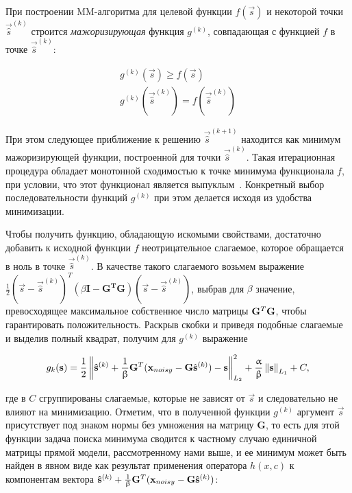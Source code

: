 При построении MM-алгоритма для целевой функции $f(\vec{s})$ и некоторой
точки $\vec{\hat{s}}^{(k)}$ строится \emph{мажоризирующая} функция $g^{(k)}$, совпадающая
с функцией $f$ в точке $\vec{\hat{s}}^{(k)}$:

\begin{gather*}
    g^{(k)}(\vec{s}) \geq f(\vec{s})\\
    g^{(k)}(\vec{\hat{s}}^{(k)}) = f(\vec{\hat{s}}^{(k)})
\end{gather*}

При этом следующее приближение к решению $\vec{\hat{s}}^{(k+1)}$ находится как
минимум мажоризирующей функции, построенной для точки $\vec{\hat{s}}^{(k)}$. Такая
итерационная процедура обладает монотонной сходимостью к точке минимума
функционала $f$, при условии, что этот функционал является выпуклым~\cite{Combettes2005}.
Конкретный выбор последовательности функций $g^{(k)}$ при этом
делается исходя из удобства минимизации.

Чтобы получить функцию, обладающую искомыми свойствами, достаточно добавить к
исходной функции $f$ неотрицательное слагаемое, которое обращается в ноль в
точке $\vec{\hat{s}}^{(k)}$.  В качестве такого слагаемого возьмем выражение
$\frac{1}{2}{(\vec{s} - \vec{\hat{s}}^{(k)})}^T {(\beta\mathbf{I - G^TG})}{(\vec{s} - \vec{\hat{s}}^{(k)})}$,
выбрав для $\beta$ значение, превосходящее максимальное собственное число матрицы
$\mathbf{G}^T\mathbf{G}$, чтобы гарантировать положительность. Раскрыв скобки и приведя подобные
слагаемые и выделив полный квадрат, получим для $g^{(k)}$ выражение

\begin{equation}
    g_k(\mathbf{s}) =
    \frac{1}{2}\left\lVert\mathbf{\hat{s}}^{(k)} + \frac{1}{\upbeta} \mathbf{G}^T(\mathbf{x}_{noisy} - \mathbf{G} \hat{\mathbf{s}}^{(k)}) - \mathbf{s}\right\rVert^2_{L_2} + \frac{\upalpha}{\upbeta}\left\lVert\mathbf{s}\right\rVert_{L_1} + C,
\end{equation}

где в $C$ сгруппированы слагаемые, которые не зависят от $\vec{s}$ и
следовательно не влияют на минимизацию. Отметим, что в полученной функции
$g^{(k)}$ аргумент $\vec{s}$ присутствует под знаком нормы без умножения на
матрицу $\mathbf{G}$, то есть для этой функции задача поиска минимума сводится
к частному случаю единичной матрицы прямой модели, рассмотренному нами выше, и
ее минимум может быть найден в явном виде как результат применения оператора
$h(x, c)$ к компонентам вектора $\mathbf{\hat{s}}^{(k)} + \frac{1}{\upbeta} \mathbf{G}^T(\mathbf{x}_{noisy} - \mathbf{G} \mathbf{\hat{s}}^{(k)})$:


